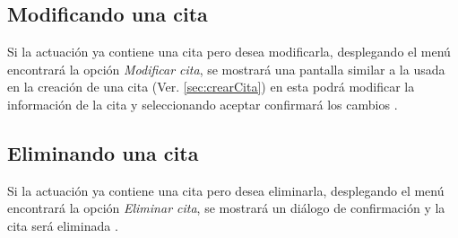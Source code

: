 \subsection{Modificando una cita}
\label{sec:modificarCita}
Si la actuaci\'on ya contiene una cita pero desea modificarla, desplegando el
men\'u \blackberry encontrar\'a la opci\'on \emph{Modificar cita}, se
mostrar\'a una pantalla similar a la usada en la creaci\'on de una cita (Ver.
\ref{sec:crearCita}) en esta podr\'a modificar la informaci\'on de la cita
y seleccionando aceptar confirmar\'a los cambios
\footnotemark[\value{footnote}].

\subsection{Eliminando una cita}
\label{sec:eliminarCita}
Si la actuaci\'on ya contiene una cita pero desea eliminarla, desplegando el
men\'u \blackberry encontrar\'a la opci\'on \emph{Eliminar cita}, se mostrar\'a
un di\'alogo de confirmaci\'on y la cita ser\'a eliminada
\footnotemark[\value{footnote}].